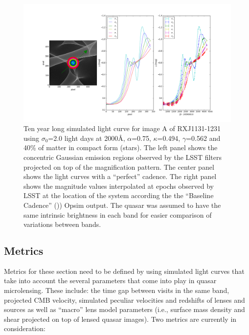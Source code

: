 \begin{center}
	\begin{figure}[hbt]
		\includegraphics[width=\textwidth]{figs/agn/sim_ex.png}
		\caption{Ten year long simulated light curve for image A of RXJ1131-1231 using $\sigma_0$=2.0 light days at 2000\AA{}, $\alpha$=0.75, $\kappa$=0.494, $\gamma$=0.562 and 40\% of matter in compact form (stars). The left panel shows the concentric Gaussian emission regions observed by the LSST filters projected on top of the magnification pattern. The center panel shows the light curves with a ``perfect'' cadence. The right panel shows the magnitude values interpolated at epochs observed by LSST at the location of the system according the the ``Baseline Cadence'' ()) Opsim output. The quasar was assumed to have the same intrinsic brightness in each band for easier comparison of variations between bands.}
		\label{microsimcurve}
	\end{figure}
\end{center}


\subsection{Metrics}
\label{sec:\secname:metrics}

Metrics for these section need to be defined by using simulated light curves
that take into account the several parameters that come into play in quasar
microlensing. These include: the time gap between visits in the same band,
projected CMB velocity, simulated peculiar velocities and redshifts of lenses
and sources as well as ``macro'' lens model parameters (i.e., surface mass
density and shear projected on top of lensed quasar images). Two metrics are
currently in consideration:

